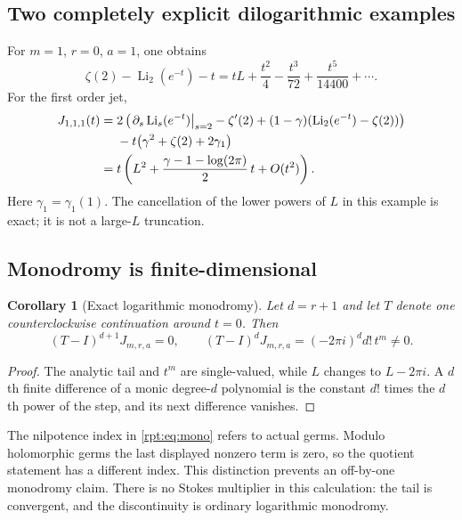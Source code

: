\documentclass[11pt,a4paper]{article}
\numberwithin{equation}{section}
\newtheorem{corollary}[theorem]{Corollary}
\theoremstyle{definition}\newtheorem{definition}[theorem]{Definition}
\theoremstyle{remark}\newtheorem{remark}[theorem]{Remark}
\newcommand{\Li}{\operatorname{Li}}
\begin{document}
\subsection{Two completely explicit dilogarithmic examples}

For $m=1$, $r=0$, $a=1$, one obtains
\begin{equation}
\zeta(2)-\Li_2(e^{-t})-t
=tL+\frac{t^2}{4}-\frac{t^3}{72}+\frac{t^5}{14400}+\cdots.
\label{rpt:eq:dilog0}
\end{equation}
For the first order jet,
\begin{align}
J_{1,1,1}(t)
={}&2\left(\left.\partial_s\Li_s(e^{-t})\right|_{s=2}-\zeta'(2)
 +(1-\gamma)(\Li_2(e^{-t})-\zeta(2))\right)
\notag\\
&-t\bigl(\gamma^2+\zeta(2)+2\gamma_1\bigr)
\label{rpt:eq:dilog1}\\
={}&t\left(L^2+\frac{\gamma-1-\log(2\pi)}2\,t+O(t^2)\right).
\notag
\end{align}
Here $\gamma_1=\gamma_1(1)$. The cancellation of the lower powers of $L$ in this example is exact; it is not a large-$L$ truncation.

\subsection{Monodromy is finite-dimensional}

\begin{corollary}[Exact logarithmic monodromy]
\label{rpt:cor:mono}
Let $d=r+1$ and let $T$ denote one counterclockwise continuation around $t=0$. Then
\begin{equation}
(T-I)^{d+1}J_{m,r,a}=0,
\qquad
(T-I)^dJ_{m,r,a}=(-2\pi i)^d d!\,t^m\ne0.
\label{rpt:eq:mono}
\end{equation}
\end{corollary}
\begin{proof}
The analytic tail and $t^m$ are single-valued, while $L$ changes to $L-2\pi i$. A $d$th finite difference of a monic degree-$d$ polynomial is the constant $d!$ times the $d$th power of the step, and its next difference vanishes.
\end{proof}

The nilpotence index in \eqref{rpt:eq:mono} refers to actual germs. Modulo holomorphic germs the last displayed nonzero term is zero, so the quotient statement has a different index. This distinction prevents an off-by-one monodromy claim. There is no Stokes multiplier in this calculation: the tail is convergent, and the discontinuity is ordinary logarithmic monodromy.
\end{document}
